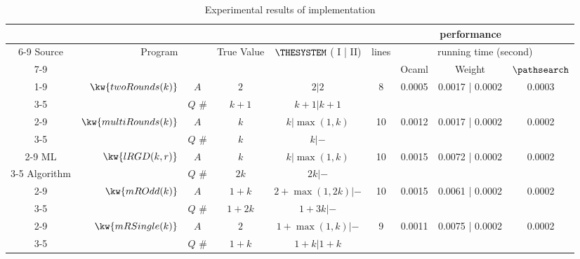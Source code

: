 
\begin {table}[H]
\vspace{-0.5cm}
    \caption{Experimental results of {\THESYSTEM} implementation}
    \vspace{-0.5cm}
        \label{tb:adapt-imp-detail}
        \begin{center}
        \centering
{\scriptsize
        \begin{tabular}{ >{\tiny}c| r | >{\tiny}c | c | c | c | c | c | c  }
         & & & & & \multicolumn{4}{c}{performance} \\ 
         \cline{6-9}
         {\scriptsize Source} & Program & & True Value & {$\THESYSTEM$ ( I | II)} & \multirow{2}{*}{{\tiny lines}} & \multicolumn{3}{c}{running time (second)} \\ 
         \cline{7-9}
         & & & & & & Ocaml & Weight & {\tiny $\pathsearch$}  \\
         \cline{1-9} 
         \cline{1-9}
         & \multirow{2}{*}{$\kw{twoRounds(k)}$}  
         & $A$ &  $2$ & $2| 2$  & \multirow{2}{*}{8} & \multirow{2}{*}{0.0005} & \multirow{2}{*}{0.0017 | 0.0002} & \multirow{2}{*}{0.0003} \\
         \cline{3-5}
         & & $Q$ \#   &  $k + 1$ & $k+1 | k+1$  & & & & \\
         \cline{2-9}
         & \multirow{2}{*}{$\kw{multiRounds(k)}$} 
         & $A$  &  $k$          & $k| \max(1,k)$  &  10 & 0.0012 & 0.0017 | 0.0002 & 0.0002 \\
         \cline{3-5}
         & & $Q$ \#   & $k $ & $k | -$  & & & & \\
         \cline{2-9}
         ML 
         & \multirow{2}{*}{$\kw{lRGD(k, r)}$}
         & $A$ & $k$ & $k | \max(1,k) $   &  10 & 0.0015 & 0.0072 | 0.0002 & 0.0002  \\
         \cline{3-5}
         Algorithm 
         & & $Q$ \#   & $2k $ & $2k | -$  & & & & \\
         \cline{2-9}
         & $\kw{mROdd(k)}$ 
         & $A$  &  $1 + k$ &  $2+\max(1,2k) | - $ &  10 & 0.0015 & 0.0061 | 0.0002 & 0.0002 \\
         \cline{3-5}
         &  & $Q$ \#   & $1+2k $ & $1 + 3k | - $  & & & & \\
         \cline{2-9}
         &  $  \kw{mRSingle(k)}$  
         & $A$ & $2$ &  $1+ \max(1, k) | -$   &  9 & 0.0011 & 0.0075 | 0.0002 & 0.0002 \\
         \cline{3-5}
         & & $Q$ \#   & $1 + k$ & $1 + k | 1 + k$ & & & & \\

\end{tabular}}
\end{center}
\end{table}
